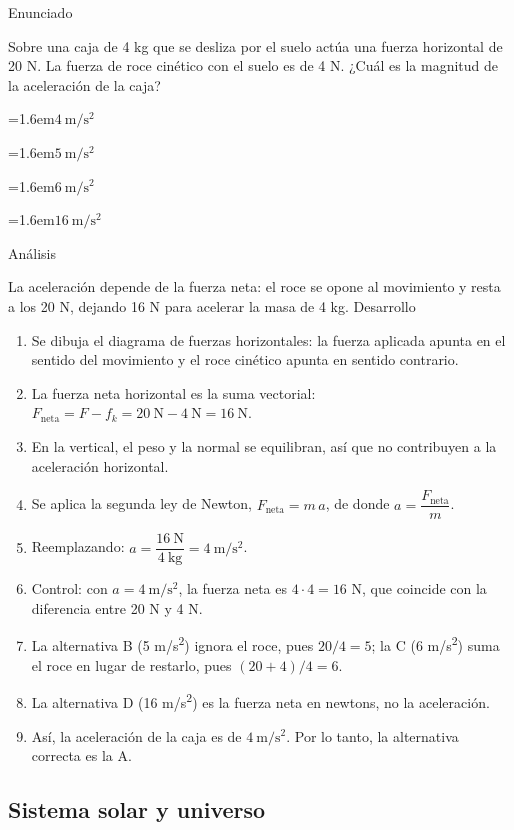 \documentclass[10pt,a4paper,twocolumn]{article}
\newcommand{\alternativa}[2]{\par\noindent\hangindent=1.6em\hangafter=1\makebox[1.6em][l]{\tecla{#1}}#2\par}
\newcommand{\clave}[1]{\par\smallskip{\sffamily\footnotesize\color{esmeralda} Clave \teclaok{#1}}\par}
\begin{document}
\begin{ejemplo}
{\sffamily\footnotesize\color{zinc500} Enunciado}\par
Sobre una caja de 4 kg que se desliza por el suelo actúa una fuerza horizontal de 20 N. La fuerza de roce cinético con el suelo es de 4 N. ¿Cuál es la magnitud de la aceleración de la caja?
\alternativa{A}{$4\ \mathrm{m/s^2}$}
\alternativa{B}{$5\ \mathrm{m/s^2}$}
\alternativa{C}{$6\ \mathrm{m/s^2}$}
\alternativa{D}{$16\ \mathrm{m/s^2}$}
\clave{A}
{\sffamily\footnotesize\color{zinc500} Análisis}\par La aceleración depende de la fuerza neta: el roce se opone al movimiento y resta a los 20 N, dejando 16 N para acelerar la masa de 4 kg.
{\sffamily\footnotesize\color{zinc500} Desarrollo}
\begin{enumerate}
  \item Se dibuja el diagrama de fuerzas horizontales: la fuerza aplicada apunta en el sentido del movimiento y el roce cinético apunta en sentido contrario.
  \item La fuerza neta horizontal es la suma vectorial: $F_{\text{neta}} = F - f_k = 20\ \mathrm{N} - 4\ \mathrm{N} = 16\ \mathrm{N}$.
  \item En la vertical, el peso y la normal se equilibran, así que no contribuyen a la aceleración horizontal.
  \item Se aplica la segunda ley de Newton, $F_{\text{neta}} = m\,a$, de donde $a = \dfrac{F_{\text{neta}}}{m}$.
  \item Reemplazando: $a = \dfrac{16\ \mathrm{N}}{4\ \mathrm{kg}} = 4\ \mathrm{m/s^2}$.
  \item Control: con $a = 4\ \mathrm{m/s^2}$, la fuerza neta es $4\cdot 4 = 16$ N, que coincide con la diferencia entre 20 N y 4 N.
  \item La alternativa B (5 m/s\textsuperscript{2}) ignora el roce, pues $20/4 = 5$; la C (6 m/s\textsuperscript{2}) suma el roce en lugar de restarlo, pues $(20 + 4)/4 = 6$.
  \item La alternativa D (16 m/s\textsuperscript{2}) es la fuerza neta en newtons, no la aceleración.
  \item Así, la aceleración de la caja es de $4\ \mathrm{m/s^2}$. Por lo tanto, la alternativa correcta es la A.
\end{enumerate}
\end{ejemplo}

\subsection{Sistema solar y universo}
\end{document}
